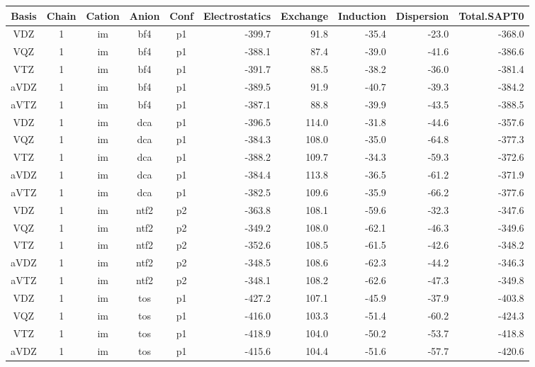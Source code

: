 \documentclass[a4paper]{article}
\begin{document}
\begin{table}[ht]
\centering
\begin{tabular}{cccccrrrrr}
  \hline 
Basis & Chain & Cation & Anion & Conf & Electrostatics & Exchange & Induction & Dispersion & Total.SAPT0 \\ 
  \hline 
VDZ &  1 & im & bf4 & p1 & -399.7 & 91.8 & -35.4 & -23.0 & -368.0 \\ 
  VQZ &  1 & im & bf4 & p1 & -388.1 & 87.4 & -39.0 & -41.6 & -386.6 \\ 
  VTZ &  1 & im & bf4 & p1 & -391.7 & 88.5 & -38.2 & -36.0 & -381.4 \\ 
  aVDZ &  1 & im & bf4 & p1 & -389.5 & 91.9 & -40.7 & -39.3 & -384.2 \\ 
  aVTZ &  1 & im & bf4 & p1 & -387.1 & 88.8 & -39.9 & -43.5 & -388.5 \\ 
  VDZ &  1 & im & dca & p1 & -396.5 & 114.0 & -31.8 & -44.6 & -357.6 \\ 
  VQZ &  1 & im & dca & p1 & -384.3 & 108.0 & -35.0 & -64.8 & -377.3 \\ 
  VTZ &  1 & im & dca & p1 & -388.2 & 109.7 & -34.3 & -59.3 & -372.6 \\ 
  aVDZ &  1 & im & dca & p1 & -384.4 & 113.8 & -36.5 & -61.2 & -371.9 \\ 
  aVTZ &  1 & im & dca & p1 & -382.5 & 109.6 & -35.9 & -66.2 & -377.6 \\ 
  VDZ &  1 & im & ntf2 & p2 & -363.8 & 108.1 & -59.6 & -32.3 & -347.6 \\ 
  VQZ &  1 & im & ntf2 & p2 & -349.2 & 108.0 & -62.1 & -46.3 & -349.6 \\ 
  VTZ &  1 & im & ntf2 & p2 & -352.6 & 108.5 & -61.5 & -42.6 & -348.2 \\ 
  aVDZ &  1 & im & ntf2 & p2 & -348.5 & 108.6 & -62.3 & -44.2 & -346.3 \\ 
  aVTZ &  1 & im & ntf2 & p2 & -348.1 & 108.2 & -62.6 & -47.3 & -349.8 \\ 
  VDZ &  1 & im & tos & p1 & -427.2 & 107.1 & -45.9 & -37.9 & -403.8 \\ 
  VQZ &  1 & im & tos & p1 & -416.0 & 103.3 & -51.4 & -60.2 & -424.3 \\ 
  VTZ &  1 & im & tos & p1 & -418.9 & 104.0 & -50.2 & -53.7 & -418.8 \\ 
  aVDZ &  1 & im & tos & p1 & -415.6 & 104.4 & -51.6 & -57.7 & -420.6 \\ 

\end{tabular}
\end{table}
\end{document}
